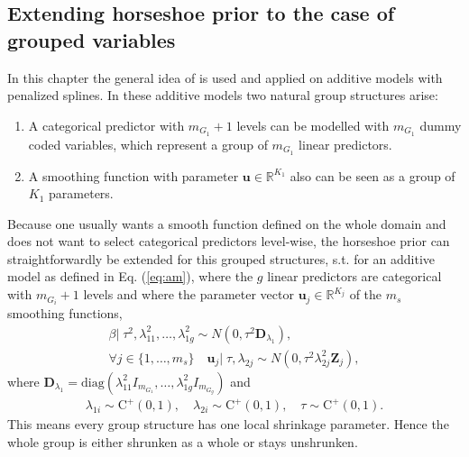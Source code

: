 \documentclass[12pt,letterpaper]{article}
\numberwithin{equation}{subsection}
\begin{document}
\subsection{Extending horseshoe prior to the case of grouped variables}
\label{sec:hsg}
In this chapter the general idea of \cite{ghs} is used and applied on additive models with penalized splines.
In these additive models two natural group structures arise:
\begin{enumerate}
\item A categorical predictor with $m_{G_1} + 1$ levels can be modelled with $m_{G_1}$ dummy coded variables, which represent a group of $m_{G_1}$ linear predictors.
\item A smoothing function with parameter $\mathbf{u} \in \mathbb{R}^{K_1}$ also can be seen as a group of $K_1$ parameters. 
\end{enumerate}
Because one usually wants a smooth function defined on the whole domain and does not want to select categorical predictors level-wise, the horseshoe prior can straightforwardly be  extended for this grouped structures, s.t. for an additive model as defined in Eq. (\ref{eq:am}), where the $g$ linear predictors are categorical with $m_{G_i} + 1$ levels and where the parameter vector $\mathbf{u}_j \in \mathbb{R}^{K_j}$ of the $m_s$ smoothing functions,
\begin{align}
\beta|\; \tau^2, \lambda^2_{11},\dots,\lambda^2_{1g} \sim N(0, \tau^2\mathbf{D}_{\lambda_1}),\\
\forall j \in  \{1,\dots,m_s\}\quad \mathbf{u}_j|\; \tau, \lambda_{2j}  \sim N(0, \tau^2\lambda_{2j}^2\mathbf{Z}_j),
\end{align}
where $\mathbf{D}_{\lambda_1} = \text{diag}(\lambda_{11}^2I_{m_{G_1}},\dots,\lambda_{1g}^2I_{m_{G_g}})$ and 
\begin{align*}
\lambda_{1i} \sim \text{C}^+(0,1), \quad \lambda_{2i} \sim \text{C}^+(0,1), \quad \tau \sim \text{C}^+(0,1).
\end{align*}
This means every group structure has one local shrinkage parameter. Hence the whole group is either shrunken as a whole or stays unshrunken.
\end{document}
